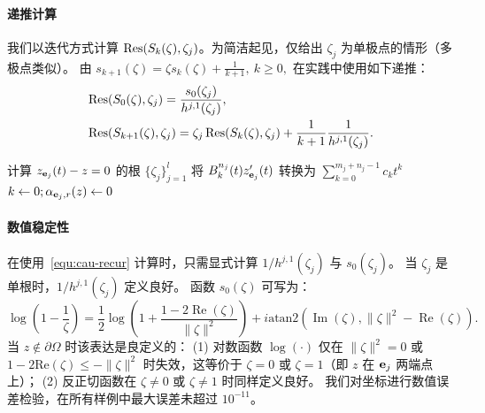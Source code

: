 \paragraph{递推计算}\label{sec:cau-encoding}
我们以迭代方式计算 \(\mathop{\mathrm{Res}}(S_{k}(\zeta),\zeta_j)\)。为简洁起见，仅给出 \(\zeta_j\) 为单极点的情形（多极点类似）。
由
    $s_{k+1}(\zeta)=\zeta s_k(\zeta)+\frac{1}{k+1},\ k\geq 0,$
在实践中使用如下递推：
\begin{equation}\label{equ:cau-recur}
\begin{aligned}
&\mathop{\mathrm{Res}}(S_{0}(\zeta),\zeta_j)=\frac{s_0(\zeta_j)}{h^{j,1}(\zeta_j)},\\
    &\mathop{\mathrm{Res}}(S_{k+1}(\zeta),\zeta_j)=\zeta_j \mathop{\mathrm{Res}}(S_k(\zeta),\zeta_j)+\frac{1}{k+1}\frac{1}{h^{j,1}(\zeta_j)}.
    \end{aligned}
\end{equation}

\begin{algorithm}[t]
  \caption{计算初始位置点 $z$ 的 Cauchy 坐标}\label{alg:cau-encoding}


  计算 $z_{\mathbf{e}_j}(t)-z=0$ 的根 $\{\zeta_j\}_{j=1}^l$\;
  将 \(B_k^{n_j}(t)z_{\mathbf{e}_j}'(t)\) 转换为 \(\sum_{k=0}^{m_j+n_j-1} c_k t^k\)\;
  $k \gets 0; \alpha_{\mathbf{e}_j,r}(z) \gets 0$\;
\end{algorithm}

\paragraph{数值稳定性}
在使用~\eqref{equ:cau-recur} 计算时，只需显式计算 $1/h^{j,1}(\zeta_j)$ 与 $s_0(\zeta_j)$。
当 \(\zeta_j\) 是单根时，$1/h^{j,1}(\zeta_j)$ 定义良好。
函数 \( s_0(\zeta) \) 可写为：
{\small
\[
\log(1-\frac{1}{\zeta}) = \frac{1}{2} \log\left(1+\frac{ 1 - 2 \operatorname{Re}(\zeta)}{\|\zeta\|^2}\right) + i \text{atan2}\left(\operatorname{Im}(\zeta), \|\zeta\|^2 - \operatorname{Re}(\zeta)\right).
\]
}
当 \( z \notin \partial \Omega \) 时该表达是良定义的：
(1) 对数函数 \( \log(\cdot) \) 仅在 \( \|\zeta\|^2 = 0 \) 或 \( 1 - 2 \text{Re}(\zeta) \leq -\|\zeta\|^2 \) 时失效，这等价于 \( \zeta = 0 \) 或 \( \zeta = 1 \)（即 \( z \) 在 $\mathbf{e}_j$ 两端点上）；
(2) 反正切函数在 \( \zeta \neq 0 \) 或 \( \zeta \neq 1 \) 时同样定义良好。
我们对坐标进行数值误差检验，在所有样例中最大误差未超过 $10^{-11}$。



